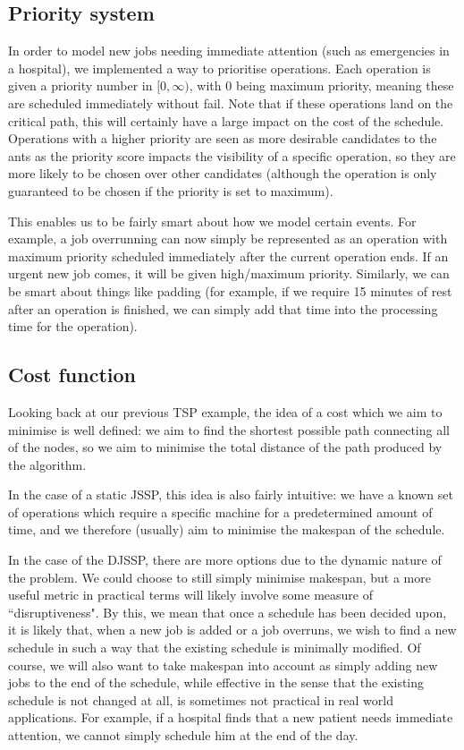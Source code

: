 \documentclass[final-report]{report-template}
\begin{document}
\subsection{Priority system}
In order to model new jobs needing immediate attention (such as emergencies in a hospital), we implemented a way to prioritise operations. Each operation is given a priority number in $[0, \infty)$, with 0 being maximum priority, meaning these are scheduled immediately without fail. Note that if these operations land on the critical path, this will certainly have a large impact on the cost of the schedule. Operations with a higher priority are seen as more desirable candidates to the ants as the priority score impacts the visibility of a specific operation, so they are more likely to be chosen over other candidates (although the operation is only guaranteed to be chosen if the priority is set to maximum).

This enables us to be fairly smart about how we model certain events. For example, a job overrunning can now simply be represented as an operation with maximum priority scheduled immediately after the current operation ends. If an urgent new job comes, it will be given high/maximum priority. Similarly, we can be smart about things like padding (for example, if we require 15 minutes of rest after an operation is finished, we can simply add that time into the processing time for the operation).

\subsection {Cost function}
Looking back at our previous TSP example, the idea of a cost which we aim to minimise is well defined: we aim to find the shortest possible path connecting all of the nodes, so we aim to minimise the total distance of the path produced by the algorithm.

In the case of a static JSSP, this idea is also fairly intuitive: we have a known set of operations which require a specific machine for a predetermined amount of time, and we therefore (usually) aim to minimise the makespan of the schedule.

In the case of the DJSSP, there are more options due to the dynamic nature of the problem. We could choose to still simply minimise makespan, but a more useful metric in practical terms will likely involve some measure of ``disruptiveness". By this, we mean that once a schedule has been decided upon, it is likely that, when a new job is added or a job overruns, we wish to find a new schedule in such a way that the existing schedule is minimally modified. Of course, we will also want to take makespan into account as simply adding new jobs to the end of the schedule, while effective in the sense that the existing schedule is not changed at all, is sometimes not practical in real world applications. For example, if a hospital finds that a new patient needs immediate attention, we cannot simply schedule him at the end of the day.
\end{document}
